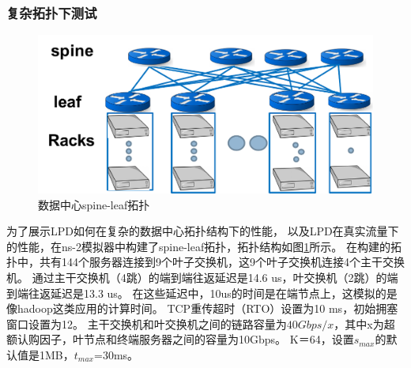 \subsubsection{复杂拓扑下测试}
\begin{figure}[H] 
  \centering
  \includegraphics[width=0.8\columnwidth]{figures/LPD/spineleaf.pdf}
  \caption{数据中心spine-leaf拓扑}
\label{DataCenterspineleaf-fig}
\end{figure}

为了展示LPD如何在复杂的数据中心拓扑结构下的性能，
以及LPD在真实流量下的性能，在ns-2模拟器中构建了spine-leaf拓扑，拓扑结构如图\ref{DataCenterspineleaf-fig}所示。
在构建的拓扑中，共有144个服务器连接到9个叶子交换机，这9个叶子交换机连接4个主干交换机。
通过主干交换机（4跳）的端到端往返延迟是14.6 us，叶交换机（2跳）的端到端往返延迟是13.3 us。
在这些延迟中，10us的时间是在端节点上，这模拟的是像hadoop这类应用的计算时间。 
TCP重传超时（RTO）设置为10 ms，初始拥塞窗口设置为12。
主干交换机和叶交换机之间的链路容量为$40 Gbps / x$，其中x为超额认购因子，叶节点和终端服务器之间的容量为10Gbps。 
K＝64，设置$s_{max}$的默认值是1MB，$t_{max}$=30ms。


